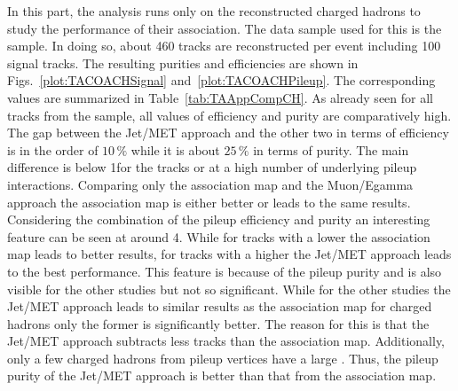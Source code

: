 In this part, the analysis runs only on the reconstructed charged hadrons to study the performance of their association. The data sample used for this is the \ttbar sample. In doing so, about 460 tracks are reconstructed per event including 100 signal tracks. The resulting purities and efficiencies are shown in Figs.~\ref{plot:TACOACHSignal} and~\ref{plot:TACOACHPileup}.  The corresponding values are summarized in Table~\ref{tab:TAAppCompCH}. As already seen for all tracks from the \ttbar sample, all values of efficiency and purity are comparatively high. The gap between the Jet/MET approach and the other two in terms of efficiency is in the order of $10\,\%$ while it is about $25\,\%$ in terms of purity. The main difference is below 1\GeV for the tracks \pt or at a high number of underlying pileup interactions. Comparing only the association map and the Muon/Egamma approach the association map is either better or leads to the same results. \\
Considering the combination of the pileup efficiency and purity an interesting feature can be seen at around 4\GeV{}. While for tracks with a lower \pt{} the association map leads to better results, for tracks with a higher \pt{} the Jet/MET approach leads to the best performance. This feature is because of the pileup purity and is also visible for the other studies but not so significant. While for the other studies the Jet/MET approach leads to similar results as the association map for charged hadrons only the former is significantly better. The reason for this is that the Jet/MET approach subtracts less tracks than the association map. Additionally, only a few charged hadrons from pileup vertices have a large \pt{}. Thus, the pileup purity of the Jet/MET approach is better than that from the association map.

